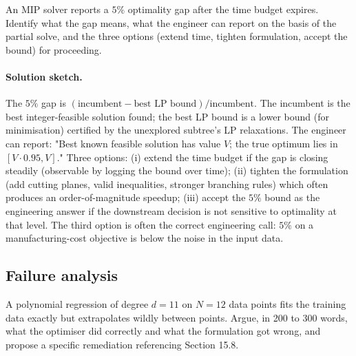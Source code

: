 \begin{exercise}
An MIP solver reports a $5\%$ optimality gap after the time
budget expires. Identify what the gap means, what the engineer
can report on the basis of the partial solve, and the three
options (extend time, tighten formulation, accept the bound) for
proceeding.
\end{exercise}

\paragraph{Solution sketch.}
The $5\%$ gap is $(\text{incumbent} - \text{best LP bound}) /
\text{incumbent}$. The incumbent is the best integer-feasible
solution found; the best LP bound is a lower bound (for
minimisation) certified by the unexplored subtree's LP
relaxations. The engineer can report: "Best known feasible
solution has value $V$; the true optimum lies in $[V \cdot 0.95,
V]$." Three options: (i) extend the time budget if the gap is
closing steadily (observable by logging the bound over time);
(ii) tighten the formulation (add cutting planes, valid
inequalities, stronger branching rules) which often produces an
order-of-magnitude speedup; (iii) accept the $5\%$ bound as the
engineering answer if the downstream decision is not sensitive to
optimality at that level. The third option is often the correct
engineering call: $5\%$ on a manufacturing-cost objective is below
the noise in the input data.

\subsection*{Failure analysis}

\begin{exercise}
A polynomial regression of degree $d = 11$ on $N = 12$ data points
fits the training data exactly but extrapolates wildly between
points. Argue, in 200 to 300 words, what the optimiser did
correctly and what the formulation got wrong, and propose a
specific remediation referencing Section 15.8.
\end{exercise}

